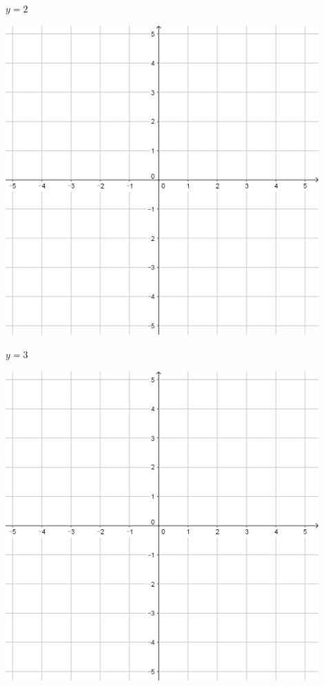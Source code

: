 \documentclass{oblivoir}
\begin{document}
\begin{minipage}{0.45\textwidth}\centering
\(y=2\)
\par\bigskip\includegraphics[width=0.9\textwidth]{55}
\end{minipage}
\begin{minipage}{0.45\textwidth}\centering
\(y=3\)
\par\bigskip\includegraphics[width=0.9\textwidth]{55}
\end{minipage}\bigskip\bigskip\par
\end{document}
